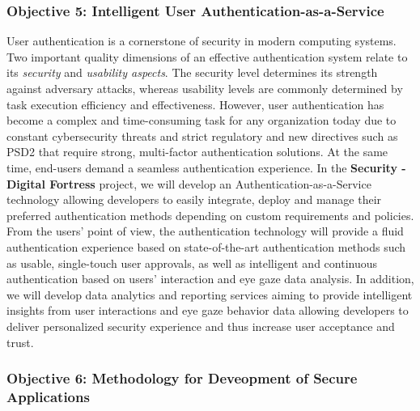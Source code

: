 \documentclass[a4paper,11pt]{article}
\newcommand{\project}[1]{\textbf{#1}\xspace}
\newcommand{\SECURITY}{\project{Security - Digital Fortress}}
\newcommand{\TheProject}{\SECURITY}
\begin{document}
\subsubsection*{Objective 5: Intelligent User Authentication-as-a-Service}
\vspace{-6pt}

User authentication is a cornerstone of security in modern computing systems. Two important quality dimensions of an effective authentication system relate to its \textit{security} and \textit{usability aspects}. The security level determines its strength against adversary attacks, whereas usability levels are commonly determined by task execution efficiency and effectiveness. However, user authentication has become a complex and time-consuming task for any organization today due to constant cybersecurity threats and strict regulatory and new directives such as PSD2 that require strong, multi-factor authentication solutions. At the same time, end-users demand a seamless authentication experience. In the \TheProject{} project, we will develop an Authentication-as-a-Service technology allowing developers to easily integrate, deploy and manage their preferred authentication methods depending on custom requirements and policies. From the users’ point of view, the authentication technology will provide a fluid authentication experience based on state-of-the-art authentication methods such as usable, single-touch user approvals, as well as intelligent and continuous authentication based on users' interaction and eye gaze data analysis. In addition, we will develop data analytics and reporting services aiming to provide intelligent insights from user interactions and eye gaze behavior data allowing developers to deliver personalized security experience and thus increase user acceptance and trust.

\subsubsection*{Objective 6: Methodology for Deveopment of Secure Applications}
\vspace{-6pt}
\end{document}
